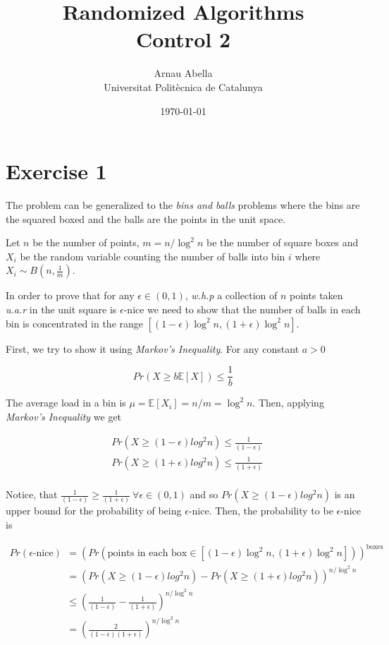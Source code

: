 \documentclass[12pt, a4paper]{article} %
\title{%
  Randomized Algorithms\\
  \large{Control 2}
}
\author{%
  Arnau Abella \\
  \large{Universitat Polit\`ecnica de Catalunya}
}
\date{\today}
\newcommand\expect[1]{\mathbb{E}[#1]}
\begin{document}
\maketitle


\section*{Exercise 1}%
\label{sec:exercise_1}

The problem can be generalized to the \textit{bins and balls} problems where the bins are the squared boxed and the balls are the points in the unit space.

Let $n$ be the number of points, $m = n/\log^{2}n$ be the number of square boxes and $X_{i}$ be the random variable counting the number of balls into bin $i$ where $X_{i} \sim B(n, \frac{1}{m})$.

In order to prove that for any $\epsilon \in (0,1)$, \textit{w.h.p} a collection of $n$ points taken \textit{u.a.r} in the unit square is $\epsilon$-nice we need to show that the number of balls in each bin is concentrated in the range $[(1-\epsilon) \log^{2}n, (1 + \epsilon)\log^{2}n]$.

First, we try to show it using \textit{Markov's Inequality}. For any constant $a > 0$

\begin{equation*}
  Pr(X \ge b\expect{X}) \le \frac{1}{b}
\end{equation*}

The average load in a bin is $\mu = \expect{X_{i}} = n/m = \log^{2} n$. Then, applying \textit{Markov's Inequality} we get

\begin{align*}
  &Pr(X \ge (1 - \epsilon)log^{2}n) \le \frac{1}{(1 - \epsilon)} \\
  &Pr(X \ge (1 + \epsilon)log^{2}n) \le \frac{1}{(1 + \epsilon)} \\
\end{align*}

Notice, that $\frac{1}{(1 - \epsilon)} \ge \frac{1}{(1 + \epsilon)} \ \forall \epsilon \in (0,1)$ and so $Pr(X \ge (1 - \epsilon)log^{2}n)$ is an upper bound for the probability of being $\epsilon$-nice. Then, the probability to be $\epsilon$-nice is

\begin{align*}
  Pr(\epsilon\text{-nice}) &= (Pr(\text{points in each box} \in [(1-\epsilon) \log^{2}n, (1 + \epsilon)\log^{2}n]))^{\text{boxes}}\\
                           &= (Pr(X \ge (1 - \epsilon)log^{2}n) - Pr(X \ge (1 + \epsilon)log^{2}n))^{n/\log^{2} n} \\
                           &\le (\frac{1}{(1 - \epsilon)} - \frac{1}{(1 + \epsilon)})^{n/\log^{2} n} \\
                           &= (\frac{2}{(1 - \epsilon)(1 + \epsilon)})^{n/\log^{2} n}
\end{align*}
\end{document}
